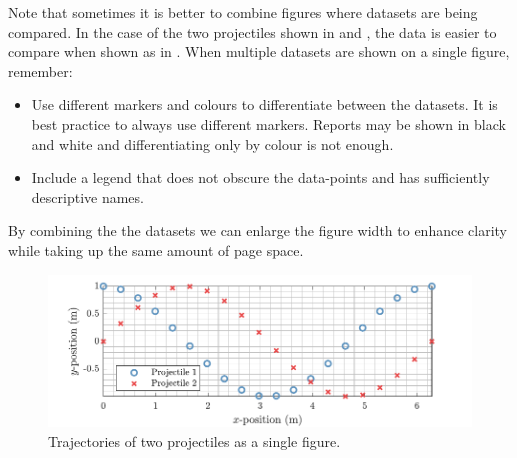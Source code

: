 Note that sometimes it is better to combine figures where datasets are being compared. In the case of the two projectiles shown in  and , the data is easier to compare when shown as in . When multiple datasets are shown on a single figure, remember:
\begin{itemize}
    \item Use different markers and colours to differentiate between the datasets. It is best practice to always use different markers. Reports may be shown in black and white and differentiating only by colour is not enough.
    \item Include a legend that does not obscure the data-points and has sufficiently descriptive names.
\end{itemize}
By combining the the datasets we can enlarge the figure width to enhance clarity while taking up the same amount of page space.

\begin{figure}
    \centering
    \includegraphics{Images/Both.pdf}
    \caption{Trajectories of two projectiles as a single figure.}
    \label{fig:OneFig}
\end{figure}
